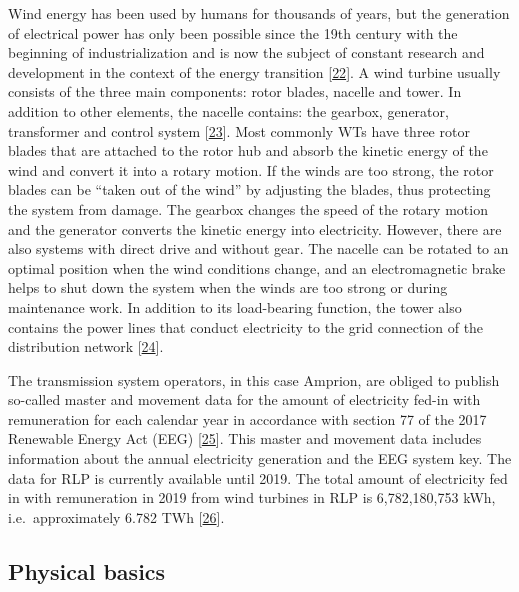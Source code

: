 \documentclass[a4paper,11pt]{article}
\begin{document}
Wind energy has been used by humans for thousands of years, but the generation of electrical power has only been possible since the 19th century with the beginning of industrialization and is now the subject of constant research and development in the context of the energy transition {[}\protect\hyperlink{ref-Wikipedia.2021}{22}{]}. A wind turbine usually consists of the three main components: rotor blades, nacelle and tower. In addition to other elements, the nacelle contains: the gearbox, generator, transformer and control system {[}\protect\hyperlink{ref-MladenBosnjakovic.2013}{23}{]}. Most commonly WTs have three rotor blades that are attached to the rotor hub and absorb the kinetic energy of the wind and convert it into a rotary motion. If the winds are too strong, the rotor blades can be ``taken out of the wind'' by adjusting the blades, thus protecting the system from damage. The gearbox changes the speed of the rotary motion and the generator converts the kinetic energy into electricity. However, there are also systems with direct drive and without gear. The nacelle can be rotated to an optimal position when the wind conditions change, and an electromagnetic brake helps to shut down the system when the winds are too strong or during maintenance work. In addition to its load-bearing function, the tower also contains the power lines that conduct electricity to the grid connection of the distribution network {[}\protect\hyperlink{ref-NetzKonstrukteur.16.11.2020}{24}{]}.

The transmission system operators, in this case Amprion, are obliged to publish so-called master and movement data for the amount of electricity fed-in with remuneration for each calendar year in accordance with section 77 of the 2017 Renewable Energy Act (EEG) {[}\protect\hyperlink{ref-Bundesgestzblatt.2017}{25}{]}. This master and movement data includes information about the annual electricity generation and the EEG system key. The data for RLP is currently available until 2019. The total amount of electricity fed in with remuneration in 2019 from wind turbines in RLP is 6,782,180,753 kWh, i.e.~approximately 6.782 TWh {[}\protect\hyperlink{ref-EnergieagenturRheinlandPfalz.2019}{26}{]}.

\hypertarget{physical-basics}{%
\subsection{Physical basics}\label{physical-basics}}
\end{document}
